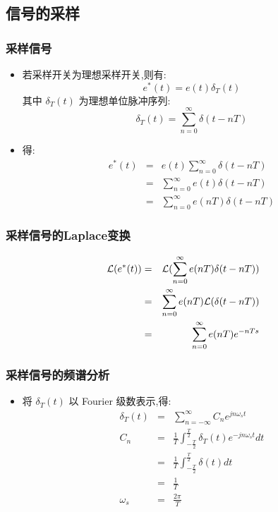 \documentclass[table]{beamer}
\begin{document}
\subsection{信号的采样}
\label{sec-2-1}
\begin{frame}
\frametitle{采样信号}
\label{sec-2-1-1}

\begin{itemize}
\item <2->若采样开关为理想采样开关,则有:  
       	\[e^*(t)=e(t)\delta_T(t)\]
      其中  $\delta_T(t)$  为理想单位脉冲序列:  
	       \[\delta_T(t)=\sum_{n=0}^{\infty}\delta(t-nT)\]
\item <3->得:
      \begin{eqnarray*}
      e^{*}(t) & = & e(t)\sum_{n=0}^{\infty}\delta(t-nT) \\
       	&=&  \sum_{n=0}^{\infty}e(t)\delta(t-nT) \\
       	&=&  \sum_{n=0}^{\infty}e(nT)\delta(t-nT) 
      \end{eqnarray*}
\end{itemize}
\end{frame}
\begin{frame}
\frametitle{采样信号的Laplace变换}
\label{sec-2-1-2}

      \begin{eqnarray*}
      {\cal L}(e^{*}(t)) & =  & {\cal L}( \sum_{n=0}^{\infty}e(nT)\delta(t-nT) )\\
      &=&  \sum_{n=0}^{\infty}e(nT){\cal L}(\delta(t-nT) )\\
      &=&  \sum_{n=0}^{\infty}e(nT)e^{-nTs}
      \end{eqnarray*}
\end{frame}
\begin{frame}
\frametitle{采样信号的频谱分析}
\label{sec-2-1-3}

\begin{itemize}
\item <2->将  $\delta_T(t)$  以 Fourier 级数表示,得: 
       \begin{eqnarray*}
       \delta_T(t) & = &\sum_{n=-\infty}^{\infty}C_n e^{jn\omega_s t} \\
       C_n &=&\frac{1}{T}\int_{-\frac{T}{2}}^{\frac{T}{2}}\delta_T(t)e^{-jn\omega_s t}dt \\
         &=&\frac{1}{T}\int_{-\frac{T}{2}}^{\frac{T}{2}}\delta(t)dt \\ 
         &=& \frac{1}{T} \\
       \omega_s &=& \frac{2\pi}{T} 
     \end{eqnarray*}
\end{itemize}
\end{frame}
\end{document}
